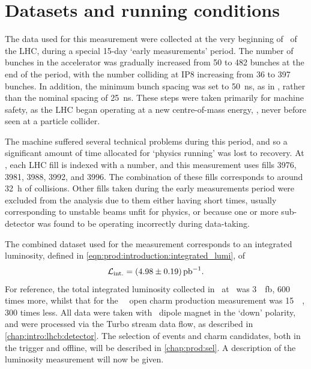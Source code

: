 \chapter{Datasets and running conditions}
\label{chap:prod:data}

The data used for this measurement were collected at the very beginning of 
\runtwo\ of the \ac{LHC}, during a special 15-day `early measurements' period.
The number of bunches in the accelerator was gradually increased from 50 to 482 
bunches at the end of the period, with the number colliding at IP8 increasing 
from 36 to 397 bunches.
In addition, the minimum bunch spacing was set to \SI{50}{\nano\second}, as in 
\runone, rather than the nominal \runtwo spacing of \SI{25}{\nano\second}.
These steps were taken primarily for machine safety, as the \ac{LHC} began 
operating at a new centre-of-mass energy, , never before seen at a 
particle collider.

The machine suffered several technical problems during this period, and so a 
significant amount of time allocated for `physics running' was lost to 
recovery.
At \lhcb, each \ac{LHC} fill is indexed with a number, and this measurement 
uses fills 3976, 3981, 3988, 3992, and 3996.
The combination of these fills corresponds to around \SI{32}{\hour} of 
collisions.
Other fills taken during the early measurements period were excluded from the 
analysis due to them either having short times, usually corresponding to 
unstable beams unfit for physics, or because one or more sub-detector was found 
to be operating incorrectly during data-taking.

The combined dataset used for the measurement corresponds to an integrated 
luminosity, defined in \cref{eqn:prod:introduction:integrated_lumi}, of
\begin{equation}
  \intlumi = \SI{\xsectotlumi}{\per\pico\barn}.
  \label{eqn:prod:xsectotlumi}
\end{equation}
For reference, the total integrated luminosity collected in \runone\ at \lhcb\ 
was \SI{3}{\per\femto\barn}, 600 times more, whilst that for the \ 
\lhcb\ open charm production measurement was \SI{15}{\per\nb}, 300 times less.
All data were taken with \lhcb\ dipole magnet in the `down' polarity, and were 
processed via the Turbo stream data flow, as described in 
\cref{chap:intro:lhcb:detector}.
The selection of events and charm candidates, both in the trigger and offline, 
will be described in \cref{chap:prod:sel}.
A description of the luminosity measurement will now be given.

